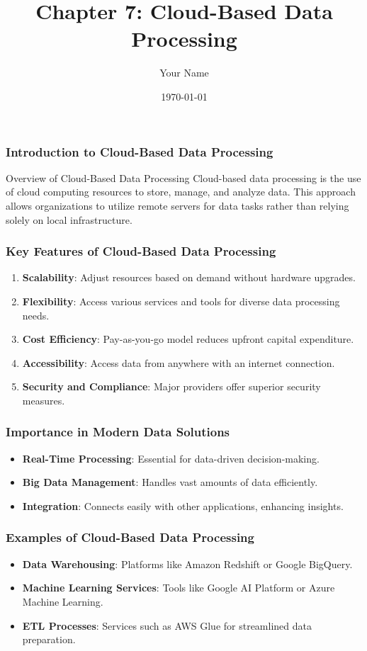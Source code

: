 \documentclass{beamer}
\title{Chapter 7: Cloud-Based Data Processing}
\author{Your Name}
\institute{Your Institution}
\date{\today}
\begin{document}
\frame{\titlepage}

\begin{frame}[fragile]
    \titlepage
\end{frame}

\begin{frame}[fragile]
    \frametitle{Introduction to Cloud-Based Data Processing}
    \begin{block}{Overview of Cloud-Based Data Processing}
        Cloud-based data processing is the use of cloud computing resources to store, manage, and analyze data. This approach allows organizations to utilize remote servers for data tasks rather than relying solely on local infrastructure.
    \end{block}
\end{frame}

\begin{frame}[fragile]
    \frametitle{Key Features of Cloud-Based Data Processing}
    \begin{enumerate}
        \item \textbf{Scalability}: Adjust resources based on demand without hardware upgrades.
        \item \textbf{Flexibility}: Access various services and tools for diverse data processing needs.
        \item \textbf{Cost Efficiency}: Pay-as-you-go model reduces upfront capital expenditure.
        \item \textbf{Accessibility}: Access data from anywhere with an internet connection.
        \item \textbf{Security and Compliance}: Major providers offer superior security measures.
    \end{enumerate}
\end{frame}

\begin{frame}[fragile]
    \frametitle{Importance in Modern Data Solutions}
    \begin{itemize}
        \item \textbf{Real-Time Processing}: Essential for data-driven decision-making.
        \item \textbf{Big Data Management}: Handles vast amounts of data efficiently.
        \item \textbf{Integration}: Connects easily with other applications, enhancing insights.
    \end{itemize}
\end{frame}

\begin{frame}[fragile]
    \frametitle{Examples of Cloud-Based Data Processing}
    \begin{itemize}
        \item \textbf{Data Warehousing}: Platforms like Amazon Redshift or Google BigQuery.
        \item \textbf{Machine Learning Services}: Tools like Google AI Platform or Azure Machine Learning.
        \item \textbf{ETL Processes}: Services such as AWS Glue for streamlined data preparation.
    \end{itemize}
\end{frame}
\end{document}

